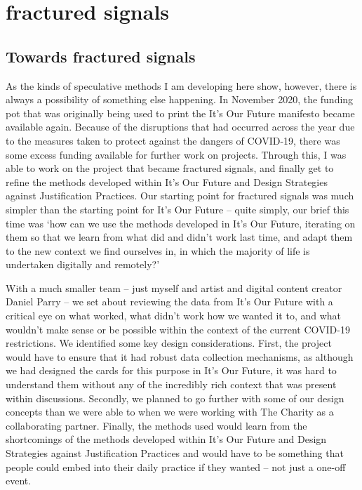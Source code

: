 \chapter{fractured signals}
\label{}

\section{Towards fractured signals}
\label{sec:}

As the kinds of speculative methods I am developing here show, however, there is always a possibility of something else happening. In November 2020, the funding pot that was originally being used to print the It’s Our Future manifesto became available again. Because of the disruptions that had occurred across the year due to the measures taken to protect against the dangers of COVID-19,  there was some excess funding available for further work on projects. Through this, I was able to work on the project that became fractured signals, and finally get to refine the methods developed within It’s Our Future and Design Strategies against Justification Practices. Our starting point for fractured signals was much simpler than the starting point for It’s Our Future – quite simply, our brief this time was ‘how can we use the methods developed in It’s Our Future, iterating on them so that we learn from what did and didn’t work last time, and adapt them to the new context we find ourselves in, in which the majority of life is undertaken digitally and remotely?’

With a much smaller team – just myself and artist and digital content creator Daniel Parry – we set about reviewing the data from It’s Our Future with a critical eye on what worked, what didn’t work how we wanted it to, and what wouldn’t make sense or be possible within the context of the current COVID-19 restrictions.  We identified some key design considerations. First, the project would have to ensure that it had robust data collection mechanisms, as although we had designed the cards for this purpose in It’s Our Future, it was hard to understand them without any of the incredibly rich context that was present within discussions. Secondly, we planned to go further with some of our design concepts than we were able to when we were working with The Charity as a collaborating partner. Finally, the methods used would learn from the shortcomings of the methods developed within It’s Our Future and Design Strategies against Justification Practices and would have to be something that people could embed into their daily practice if they wanted – not just a one-off event. 

